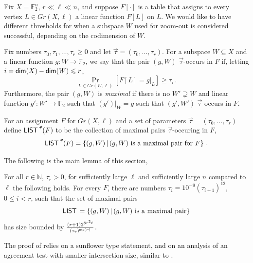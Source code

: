 \documentclass{toc}
\newcommand\Set[2]{ \left\{ #1 \,  \vert  \, #2\right\} }
\newcommand*\dimm{{\sf dim}}
\renewcommand\dim{\dimm}
\renewcommand\ge{\geqslant}
\renewcommand\le{\leqslant}
\renewcommand\subset{\subseteq}
\def\M{{\sf LIST\,}}
\def\F{\mathbb{F}}
\begin{document}
Fix $X = \F_2^n$,
$r\ll \ell \ll n$, and suppose $F[\cdot]$ is a table that assigns to
every vertex $L\in Gr(X,\ell)$ a linear function $F[L]$ on $L$. We
would like to have different thresholds for when a subspace $W$ used
for zoom-out is considered successful, depending on the codimension
of $W$.

%
\begin{definition}
  Fix numbers $\tau_0,\tau_1,\ldots,\tau_r\ge 0$ and let
  $\vec\tau=(\tau_0,\ldots,\tau_r)$. For a subspace $W\subset X$ and a
  linear function $g:W\to\F_2$, we say that the pair $(g,W)$
  $\vec\tau$-occurs in $F$ if, %
  letting
  $i = \dim(X) - \dim(W)\le r$,
\[  \Pr_{L\in Gr(W,\ell)}[F[L] = g|_L] \ge \tau_i \,.
\]
Furthermore, the pair $(g,W)$ is {\em maximal} if there is no $W'\supsetneq W$ and linear function $g':W'\to\F_2$ such that $(g')|_W=g$ such that $(g',W')$ $\vec\tau$-occurs in $F$.
\end{definition}
%
%
%
\begin{definition}\label{def:Mlist}  %
For an assignment $F$ for $Gr(X,\ell)$ and a set of parameters $\vec\tau=(\tau_0,\ldots,\tau_r)$ define $\M^{\vec\tau}(F)$ to be the collection of maximal pairs $\vec\tau$-occuring in $F$,
\[ \M^{\vec\tau}(F) = \Set{(g,W)}{ (g,W)\hbox{ is a maximal pair for }F}\,.
\]
\end{definition}
%
The following is the main lemma of this section,
%
\begin{lemma}\label{lemma:list-dec}  %
For all $r\in\mathbb{N}$, $\tau_r>0$, for sufficiently large $\ell$ and sufficiently large $n$ compared to $\ell$ the following holds.
For every $F$, there are numbers $\tau_i = 10^{-9} (\tau_{i+1})^{12}$, $0\le i < r$, such that the set of maximal pairs
\[ \M = \Set{(g,W)}{ (g,W)\hbox{ is a maximal pair}}
\]
has size bounded by $\frac{(r+1)2^{8r^2\ell}}{(\tau_r)^{{\sf exp}(r)}}$.
\end{lemma}
%
The proof of  relies on a sunflower type statement, and on an analysis of an agreement test with smaller intersection size, similar to .
\end{document}
